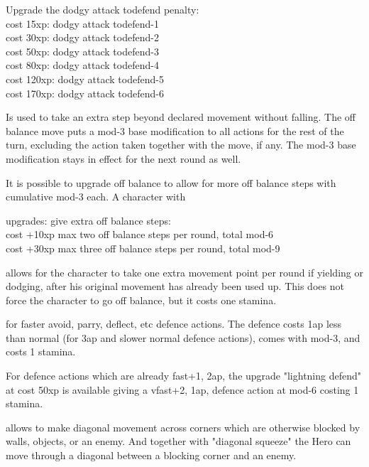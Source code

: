Upgrade the dodgy attack todefend penalty:\\
cost  15xp: dodgy attack todefend-1 \\
cost  30xp: dodgy attack todefend-2 \\
cost  50xp: dodgy attack todefend-3 \\
cost  80xp: dodgy attack todefend-4 \\
cost 120xp: dodgy attack todefend-5 \\
cost 170xp: dodgy attack todefend-6


Is used to take an extra step beyond declared movement without falling. The off balance move puts a mod-3 base modification to all actions for the rest of the turn, excluding the action taken together with the move, if any. The mod-3 base modification stays in effect for the next round as well.

It is possible to upgrade off balance to allow for more off balance steps with cumulative mod-3 each. A character with 

upgrades: give extra off balance steps: \\
cost +10xp max two off balance steps per round, total mod-6 \\
cost +30xp max three off balance steps per round, total mod-9


 allows for the character to take one extra movement point per round if yielding or dodging, after his original movement has already been used up. This does not force the character to go off balance, but it costs one stamina.


 for faster avoid, parry, deflect, etc defence actions. The defence costs 1ap less than normal (for 3ap and slower normal defence actions), comes with mod-3, and costs 1 stamina.

For defence actions which are already fast+1, 2ap, the upgrade "lightning defend" at cost 50xp is available giving a vfast+2, 1ap, defence action at mod-6 costing 1 stamina.


 allows to make diagonal movement across corners which are otherwise blocked by walls, objects, or an enemy. And together with "diagonal squeeze" the Hero can move through a diagonal between a blocking corner and an enemy.


